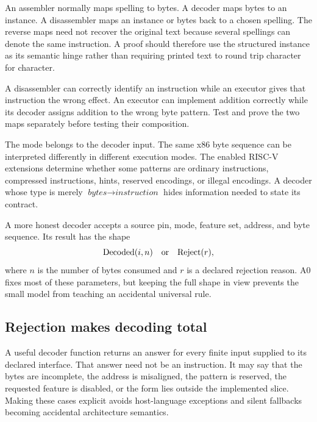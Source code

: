 An assembler normally maps spelling to bytes. A decoder maps bytes to an
instance. A disassembler maps an instance or bytes back to a chosen spelling.
The reverse maps need not recover the original text because several spellings
can denote the same instruction. A proof should therefore use the structured
instance as its semantic hinge rather than requiring printed text to round
trip character for character.

\begin{warning}[title={A successful disassembly is not an execution proof}]
A disassembler can correctly identify an instruction while an executor gives
that instruction the wrong effect. An executor can implement addition
correctly while its decoder assigns addition to the wrong byte pattern. Test
and prove the two maps separately before testing their composition.
\end{warning}

The mode belongs to the decoder input. The same x86 byte sequence can be
interpreted differently in different execution modes. The enabled RISC-V
extensions determine whether some patterns are ordinary instructions,
compressed instructions, hints, reserved encodings, or illegal encodings. A
decoder whose type is merely \(
\textit{bytes}\to\textit{instruction}
\) hides information needed to state its contract.

A more honest decoder accepts a source pin, mode, feature set, address, and
byte sequence. Its result has the shape
\[
  \mathrm{Decoded}(i,n)\quad\hbox{or}\quad\mathrm{Reject}(r),
\]
where \(n\) is the number of bytes consumed and \(r\) is a declared rejection
reason. A0 fixes most of these parameters, but keeping the full shape in view
prevents the small model from teaching an accidental universal rule.

\subsection{Rejection makes decoding total}

A useful decoder function returns an answer for every finite input supplied to
its declared interface. That answer need not be an instruction. It may say
that the bytes are incomplete, the address is misaligned, the pattern is
reserved, the requested feature is disabled, or the form lies outside the
implemented slice. Making these cases explicit avoids host-language exceptions
and silent fallbacks becoming accidental architecture semantics.

